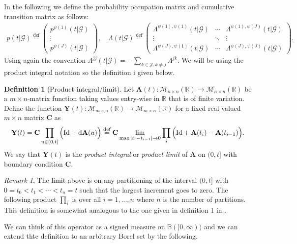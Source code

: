 \documentclass[12pt,letter,twoside]{article}
\theoremstyle{plain}
\theoremstyle{definition}
\newtheorem{definition}[theorem]{Definition}
\theoremstyle{remark}
\newtheorem*{remark}{Remark}
\begin{document}
In the following we define the probability occupation matrix and cumulative transition matrix as follows:
\begin{align}
p(t\vert\mathcal G)\stackrel{\text{def}}{=}\begin{pmatrix}
p^{\psi(1)}(t\vert\mathcal G)\\
\vdots\\
p^{\psi(J)}(t\vert\mathcal G)
\end{pmatrix},\quad \Lambda(t\vert\mathcal G)\stackrel{\text{def}}{=}\begin{pmatrix}
\Lambda^{\psi(1),\psi(1)}(t\vert\mathcal G) & \cdots & \Lambda^{\psi(1),\psi(J)}(t\vert\mathcal G)\\
\vdots & \ddots & \vdots\\
\Lambda^{\psi(J),\psi(1)}(t\vert\mathcal G) & \cdots & \Lambda^{\psi(J),\psi(J)}(t\vert\mathcal G)
\end{pmatrix}.
\end{align}
Using again the convention $\Lambda^{jj}(t\vert\mathcal G)=-\sum_{k\in\mathcal J, k \ne j}\Lambda^{jk}$. We will be using the product integral notation so the definition i given below.
\begin{definition}[Product integral/limit]\label{def:prod1}
Let $\mathbf A(t) : \mathcal M_{n\times n}(\mathbb R)\to \mathcal M_{n\times n}(\mathbb R)$ be a $m\times n$-matrix function taking values entry-wise in $\mathbb R$ that is of finite variation. Define the function $\mathbf Y(t) : \mathcal M_{m\times n}(\mathbb R)\to \mathcal M_{m\times n}(\mathbb R)$ for a fixed real-valued $m\times n$ matrix $\mathbf C$ as
\begin{align}
\mathbf Y(t)=\mathbf C\prod_{u\in (0,t]}\Big(\text{Id}+\text d\mathbf A(u)\Big)\stackrel{\text{def}}{=}\mathbf C\lim_{\max\vert t_i-t_{i-1}\vert\to 0} \prod_{i}\Big(\text{Id}+\mathbf A(t_i)-\mathbf A(t_{i-1})\Big).
\end{align}
We say that $\mathbf Y(t)$ is the \textit{product integral} or \textit{product limit} of $\mathbf A$ on $(0,t]$ with boundary condition $\mathbf C$.
\end{definition}
\begin{remark}
The limit above is on any partitioning of the interval $(0,t]$ with $0=t_0<t_1<\cdots < t_n=t$ such that the largest increment goes to zero. The following product $\prod_i$ is over all $i=1,...,n$ where $n$ is the number of partitions. This definition is somewhat analogous to the one given in definition 1 in \cite{Gill1990}.
\end{remark}
We can think of this operator as a signed measure on $\mathbb B([0,\infty))$ and we can extend thte definition to an arbitrary Borel set by the following.
\end{document}
